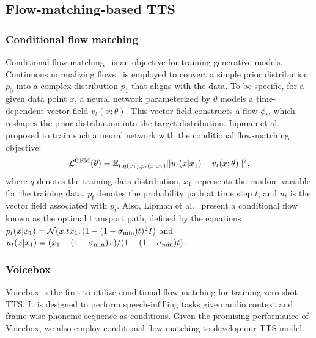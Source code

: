 \vspace{-.5em}
\subsection{Flow-matching-based TTS}
\vspace{-.5em}
\subsubsection{Conditional flow matching}
\vspace{-.5em}

Conditional flow-matching~\cite{lipman2023flow} is an objective for training generative models. 
Continuous normalizing flows~\cite{chen2018neural} is employed to convert a simple prior distribution $p_0$ into a complex distribution $p_1$ that aligns with the data.
To be specific, for a given data point $x$, a neural network parameterized by $\theta$ models a time-dependent vector field $v_t(x;\theta)$. 
This vector field constructs a flow $\phi_t$, which reshapes the prior distribution into the target distribution.
Lipman et al.~\cite{lipman2023flow} proposed to train such a neural network 
with the conditional flow-matching objective:
\begin{equation}
\mathcal{L}^{\rm CFM}(\theta)=\mathbb{E}_{t,q(x_1), p_t(x|x_1)}||u_t(x|x_1)-v_t(x;\theta)||^2,
\end{equation}
where $q$ denotes the training data distribution, $x_1$ represents the random variable for the training data, $p_t$ denotes the probability path at time step $t$, and $u_t$ is the vector field associated with $p_t$.
Also, Lipman et al.~\cite{lipman2023flow} present a conditional flow known as the optimal transport path, defined by the equations $p_t(x|x_1) = \mathcal{N}(x|tx_1, (1 - (1 - \sigma_{\rm min})t)^2I)$ and $u_t(x|x_1) = (x_1 - (1 - \sigma_{\rm min})x)/(1 - (1 - \sigma_{\rm min})t)$.

\vspace{-.5em}
\subsubsection{Voicebox}
\vspace{-.5em}

Voicebox \cite{le2024voicebox} is the first to utilize conditional flow matching for training zero-shot TTS. 
It is designed to perform speech-infilling tasks given audio context and frame-wise phoneme sequence as conditions.
Given the promising performance of Voicebox, we also employ conditional flow matching to develop our TTS model.


